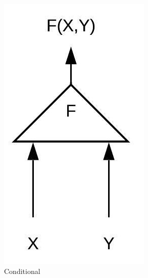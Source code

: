 \begin{figure}[htb]
    \centering
    \begin{subfigure}[b]{0.25\textwidth}
        \includegraphics[width=\textwidth]{figs/EBM1-2.jpeg}
        \caption{Conditional}
        \label{fig:conditional}
    \end{subfigure}
    \begin{subfigure}[b]{0.27\textwidth}

\end{subfigure}
\end{figure}

